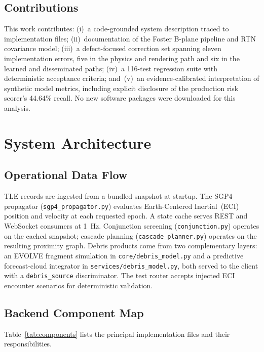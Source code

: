\documentclass[conference]{IEEEtran}
\begin{document}
\subsection*{Contributions}
This work contributes: (i)~a code-grounded system description traced to
implementation files; (ii)~documentation of the Foster B-plane pipeline and RTN
covariance model; (iii)~a defect-focused correction set spanning eleven
implementation errors, five in the physics and rendering path and six in the
learned and disseminated paths; (iv)~a 116-test regression suite with
deterministic acceptance criteria; and~(v)~an evidence-calibrated interpretation
of synthetic model metrics, including explicit disclosure of the production risk
scorer's 44.64\% recall. No new software packages were downloaded for this
analysis.

\section{System Architecture}
\label{sec:arch}

\subsection{Operational Data Flow}

TLE records are ingested from a bundled snapshot at startup. The SGP4 propagator
(\texttt{sgp4\_propagator.py}) evaluates Earth-Centered Inertial~(ECI) position
and velocity at each requested epoch. A state cache serves REST and WebSocket
consumers at 1~Hz. Conjunction screening (\texttt{conjunction.py}) operates on
the cached snapshot; cascade planning (\texttt{cascade\_planner.py}) operates on
the resulting proximity graph. Debris products come from two complementary
layers: an EVOLVE fragment simulation in \texttt{core/debris\_model.py} and a
predictive forecast-cloud integrator in \texttt{services/debris\_model.py}, both
served to the client with a \texttt{debris\_source} discriminator. The test
router accepts injected ECI encounter scenarios for deterministic validation.

\subsection{Backend Component Map}

Table~\ref{tab:components} lists the principal implementation files and their
responsibilities.
\end{document}
